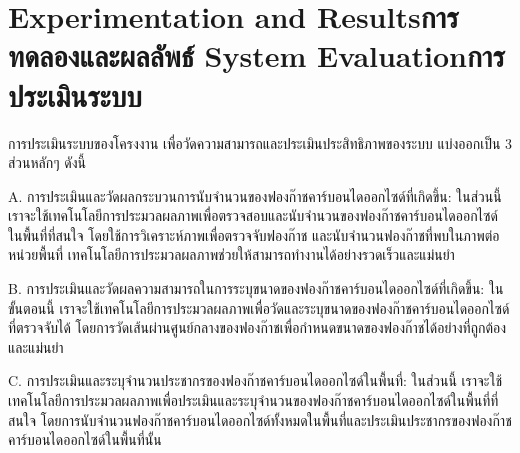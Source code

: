 \chapter{\ifproject%
\ifenglish Experimentation and Results\else การทดลองและผลลัพธ์\fi
\else%
\ifenglish System Evaluation\else การประเมินระบบ\fi
\fi}

การประเมินระบบของโครงงาน เพื่อวัดความสามารถและประเมินประสิทธิภาพของระบบ แบ่งออกเป็น 3 ส่วนหลักๆ ดังนี้

A. การประเมินและวัดผลกระบวนการนับจำนวนของฟองก๊าชคาร์บอนไดออกไซด์ที่เกิดขึ้น:
ในส่วนนี้ เราจะใช้เทคโนโลยีการประมวลผลภาพเพื่อตรวจสอบและนับจำนวนของฟองก๊าชคาร์บอนไดออกไซด์ในพื้นที่ที่สนใจ โดยใช้การวิเคราะห์ภาพเพื่อตรวจจับฟองก๊าช และนับจำนวนฟองก๊าชที่พบในภาพต่อหน่วยพื้นที่ เทคโนโลยีการประมวลผลภาพช่วยให้สามารถทำงานได้อย่างรวดเร็วและแม่นยำ

B. การประเมินและวัดผลความสามารถในการระบุขนาดของฟองก๊าชคาร์บอนไดออกไซด์ที่เกิดขึ้น:
ในขั้นตอนนี้ เราจะใช้เทคโนโลยีการประมวลผลภาพเพื่อวัดและระบุขนาดของฟองก๊าชคาร์บอนไดออกไซด์ที่ตรวจจับได้ โดยการวัดเส้นผ่านศูนย์กลางของฟองก๊าชเพื่อกำหนดขนาดของฟองก๊าชได้อย่างที่ถูกต้องและแม่นยำ




C. การประเมินและระบุจำนวนประชากรของฟองก๊าชคาร์บอนไดออกไซด์ในพื้นที่:
ในส่วนนี้ เราจะใช้เทคโนโลยีการประมวลผลภาพเพื่อประเมินและระบุจำนวนของฟองก๊าชคาร์บอนไดออกไซด์ในพื้นที่ที่สนใจ โดยการนับจำนวนฟองก๊าชคาร์บอนไดออกไซด์ทั้งหมดในพื้นที่และประเมินประชากรของฟองก๊าชคาร์บอนไดออกไซด์ในพื้นที่นั้น

